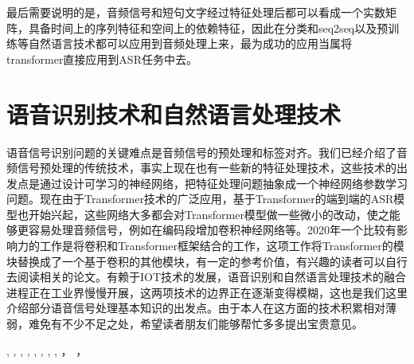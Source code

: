 \documentclass[twoside,a4paper,12pt]{book}%
\begin{document}
最后需要说明的是，音频信号和短句文字经过特征处理后都可以看成一个实数矩阵，具备时间上的序列特征和空间上的依赖特征，因此在分类和seq2seq以及预训练等自然语言技术都可以应用到音频处理上来，最为成功的应用当属将transformer直接应用到ASR任务中去。

\section{语音识别技术和自然语言处理技术}
语音信号识别问题的关键难点是音频信号的预处理和标签对齐。我们已经介绍了音频信号预处理的传统技术，事实上现在也有一些新的特征处理技术，这些技术的出发点是通过设计可学习的神经网络，把特征处理问题抽象成一个神经网络参数学习问题。现在由于Transformer技术的广泛应用，基于Transformer的端到端的ASR模型也开始兴起，这些网络大多都会对Transformer模型做一些微小的改动，使之能够更容易处理音频信号，例如在编码段增加卷积神经网络等。2020年一个比较有影响力的工作是将卷积和Transformer框架结合的工作，这项工作将Transformer的模块替换成了一个基于卷积的其他模块，有一定的参考价值，有兴趣的读者可以自行去阅读相关的论文。有赖于IOT技术的发展，语音识别和自然语言处理技术的融合进程正在工业界慢慢开展，这两项技术的边界正在逐渐变得模糊，这也是我们这里介绍部分语音信号处理基本知识的出发点。由于本人在这方面的技术积累相对薄弱，难免有不少不足之处，希望读者朋友们能够帮忙多多提出宝贵意见。

\cite{Moody2016Mixing,2019Hierarchically,2016Attention},
\cite{Liu2016Attention},
\cite{peters-etal-2018-deep},
\cite{2016Pairwise,inproceedings},
\cite{Talman2019Sentence,2001Greedy},
\cite{zhang2015character-level},
\cite{yang2016hierarchical}
\cite{joulin2017bag,lai2015recurrent,hochreiter1997long,Pennington2014Glove,2017Fixing,2018Slot,1997Long,wang2018glue,dauphin2016language,mikolov2010recurrent},
\cite{radford2019language,vaswani2017attention,strubell2017fast,huang2015bidirectional,devlin2018bert,chen2017enhanced,yin2016abcnn,humeau2019poly-encoders},
\cite{mikolov2013efficient,sutskever2014sequence,chen2016xgboost,suykens2001support,akhtar2019textrank,blei2003latent,bengio2003a,kim2014convolutional}
\cite{bahdanau2014neural,ID_lihang,ID_zhouzhihua,2018A,Baradaran2020A,2016Bidirectional}
\cite{2018QANet,2016ReasoNet,2016Machine,2017MEMEN,2015Teaching,2017RACE,2016Iterative,2016Dynamic}
\cite{Joachims2009Learning,papineni2002bleu,yang2019xlnet,dai2019transformerxl,m2019spanbert,gehring2017convolutional}
\cite{inproceedings,chang2008bigtable}
\cite{shi2010list-wise,shen2014a,Kiefel_underreview,chang2020pre-training}
\cite{li2018survey,joachims2002optimizing}
\cite{peters-etal-2018-deep}
\cite{2016Pairwise,2017A,2018Investigating,2017Deep1}
\cite{zhang2015character-level,2003A,2012A}
\cite{yang2016hierarchical,2020ERNIE}
\cite{Talman2019Sentence,chen2017enhanced,Krizhevsky2012ImageNet}，
\cite{kingma2014adam,Hinton2014A,Rumelhart1986Learning,2019RoBERTa}，
\cite{10.5555/3086952,dai2019transformer-xl,2017Focal,IDPatternrecognition,IDMTBook,IDCNLP,Lecun2015Deep}
\cite{fayek2016,2004Algorithm,LightGBM,tyagi2003mel-cepstrum}
  

\end{document}
